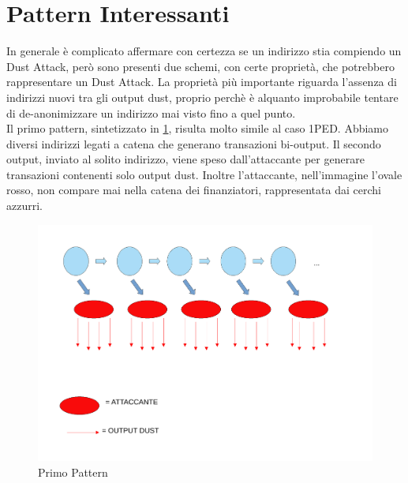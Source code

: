 \section{Pattern Interessanti}
In generale è complicato affermare con certezza se un indirizzo stia compiendo un Dust Attack, però sono presenti due schemi, con certe proprietà, che potrebbero rappresentare un Dust Attack. La proprietà più importante riguarda l'assenza di indirizzi nuovi tra gli output dust, proprio perchè è alquanto improbabile tentare di de-anonimizzare un indirizzo mai visto fino a quel punto.\\
Il primo pattern, sintetizzato in \ref{fig:schema1}, risulta molto simile al caso 1PED. Abbiamo diversi indirizzi legati a catena che generano transazioni bi-output. Il secondo output, inviato al solito indirizzo, viene speso dall'attaccante per generare transazioni contenenti solo output dust. Inoltre l'attaccante, nell'immagine l'ovale rosso, non compare mai nella catena dei finanziatori, rappresentata dai cerchi azzurri.
\begin{figure}[h!]
    \centering
    \includegraphics[scale=0.4]{Images/dust_attack1.pdf}
    \caption{Primo Pattern}
    \label{fig:schema1}
\end{figure}
\FloatBarrier
